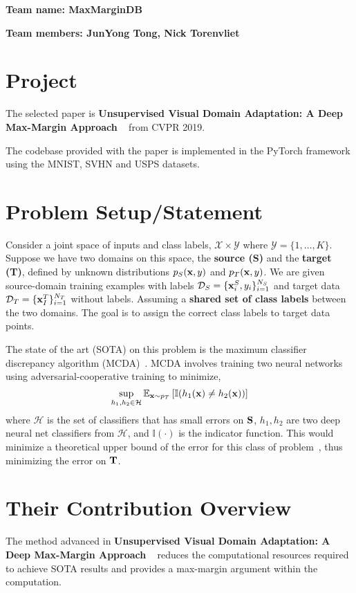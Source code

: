 \textbf{Team name: MaxMarginDB}

\textbf{Team members: JunYong Tong, Nick Torenvliet}

\section*{Project}
The selected paper is \textbf{Unsupervised Visual Domain Adaptation: A Deep Max-Margin Approach} ~\cite{kim2019unsupervised} from CVPR 2019.

The codebase provided with the paper is implemented in the PyTorch framework using the MNIST, SVHN and USPS datasets. 



\section*{Problem Setup/Statement}
Consider a joint space of inputs and class labels, \(\mathcal{X} \times \mathcal{Y}\) where \(\mathcal{Y} = \{1,\dots,K\}\). 
Suppose we have two domains on this space, the \textbf{source (S)} and the \textbf{target (T)}, defined by unknown distributions \(p_S(\boldsymbol{\mathbf{x}}, y)\) and \(p_T(\boldsymbol{\mathbf{x}},y)\).
We are given source-domain training examples with labels \(\mathcal{D}_S = \{\boldsymbol{\mathbf{x}}_i^S, y_i\}_{i=1}^{N_S}\) and target data \(\mathcal{D}_T = \{\boldsymbol{\mathbf{x}}_I^T\}_{i=1}^{N_T}\) without labels.
Assuming a \textbf{shared set of class labels} between the two domains. The goal is to assign the correct class labels to target data points.

The state of the art (SOTA) on this problem is the maximum classifier discrepancy algorithm (MCDA)~\cite{saito2018maximum}. MCDA involves training two neural networks using adversarial-cooperative training to minimize,
\begin{equation} \label{eq:minimax}
    \sup_{h_1, h_2 \in \mathcal{H}} \mathbb{E}_{\boldsymbol{\mathbf{x}} \sim p_T} \, [\mathbb{I}(h_1(\boldsymbol{\mathbf{x}}) \neq h_2(\boldsymbol{\mathbf{x}}))]
\end{equation}
where \(\mathcal{H}\) is the set of classifiers that has small errors on \(\boldsymbol{\mathbf{S}}\), \(h_1, h_2\) are two deep neural net classifiers from \(\mathcal{H}\), and \(\mathbb{I}(\cdot)\) is the indicator function. This would minimize a theoretical upper bound of the error for this class of problem~\cite{ben2010theory}, thus minimizing the error on \(\boldsymbol{\mathbf{T}}\).

\section*{Their Contribution Overview}
The method advanced in \textbf{Unsupervised Visual Domain Adaptation: A Deep Max-Margin Approach} ~\cite{kim2019unsupervised} reduces the computational resources required to achieve SOTA results and provides a max-margin argument within the computation. 

